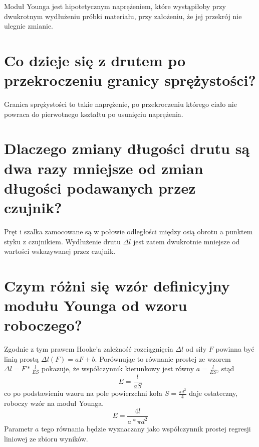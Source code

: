 \documentclass[a4paper,11pt]{article} %
\begin{document}
Moduł Younga jest hipotetycznym naprężeniem, które wystąpiłoby przy dwukrotnym wydłużeniu próbki materiału, przy założeniu, że jej przekrój nie ulegnie zmianie.

\section{Co dzieje się z drutem po przekroczeniu granicy sprężystości? 
}
Granica sprężystości to takie naprężenie, po przekroczeniu którego ciało nie powraca do pierwotnego kształtu po usunięciu naprężenia.

\section{ Dlaczego zmiany długości drutu są dwa razy mniejsze od zmian długości
podawanych przez czujnik?} 
Pręt i szalka zamocowane są w połowie
odległości między osią obrotu a punktem styku z czujnikiem. Wydłużenie drutu $\Delta l$ jest zatem
dwukrotnie mniejsze od wartości wskazywanej przez czujnik.

\section{Czym różni się wzór definicyjny modułu Younga od wzoru roboczego?}
Zgodnie z tym prawem Hooke'a zależność rozciągnięcia $\Delta l$ od siły $F$ powinna być linią prostą $\Delta l(F) = aF+b$. Porównując
to równanie prostej ze wzorem $ \Delta l = F*\frac{l}{ES}$ pokazuje, że współczynnik kierunkowy jest równy $a=\frac{l}{ES}$, stąd
\begin{equation}
E=\frac{l}{aS}
\end{equation}
co po podstawieniu wzoru na pole powierzchni koła $S=\frac{\pi d^2}{4}$ daje ostateczny, roboczy wzór na moduł Younga.
\begin{equation}
\label{eq:young}
E = \frac{4l}{a*\pi d^2}
\end{equation}
Parametr $a$ tego równania będzie wyznaczany jako współczynnik prostej regresji liniowej ze zbioru wyników.
\end{document}
